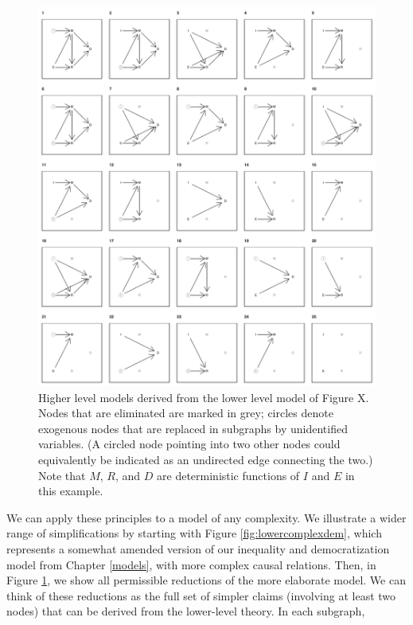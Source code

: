 \documentclass[
  12pt,
]{book}
\begin{document}
\begin{figure}
\centering
\includegraphics{ii_files/figure-latex/runningsubs-1.pdf}
\caption{\label{fig:runningsubs}Higher level models derived from the lower level model of Figure X. Nodes that are eliminated are marked in grey; circles denote exogenous nodes that are replaced in subgraphs by unidentified variables. (A circled node pointing into two other nodes could equivalently be indicated as an undirected edge connecting the two.) Note that \(M\), \(R\), and \(D\) are deterministic functions of \(I\) and \(E\) in this example.}
\end{figure}

We can apply these principles to a model of any complexity. We illustrate a wider range of simplifications by starting with Figure \ref{fig:lowercomplexdem}, which represents a somewhat amended version of our inequality and democratization model from Chapter \ref{models}, with more complex causal relations. Then, in Figure \ref{fig:runningsubs}, we show all permissible reductions of the more elaborate model. We can think of these reductions as the full set of simpler claims (involving at least two nodes) that can be derived from the lower-level theory. In each subgraph,
\end{document}
